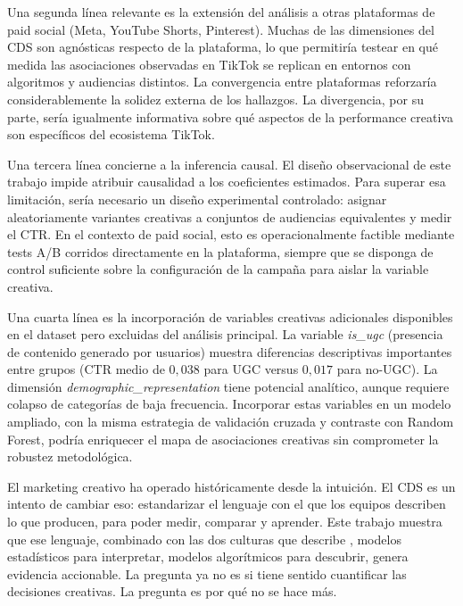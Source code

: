 \documentclass[12pt, a4paper]{report}
\begin{document}
Una segunda línea relevante es la extensión del análisis a otras plataformas de paid
social (Meta, YouTube Shorts, Pinterest). Muchas de las dimensiones del CDS son
agnósticas respecto de la plataforma, lo que permitiría testear en qué medida las
asociaciones observadas en TikTok se replican en entornos con algoritmos y audiencias
distintos. La convergencia entre plataformas reforzaría considerablemente la solidez
externa de los hallazgos. La divergencia, por su parte, sería igualmente informativa sobre
qué aspectos de la performance creativa son específicos del ecosistema TikTok.

Una tercera línea concierne a la inferencia causal. El diseño observacional de este trabajo
impide atribuir causalidad a los coeficientes estimados. Para superar esa limitación, sería
necesario un diseño experimental controlado: asignar aleatoriamente variantes creativas a
conjuntos de audiencias equivalentes y medir el CTR. En el contexto de paid
social, esto es operacionalmente factible mediante tests A/B corridos directamente en la
plataforma, siempre que se disponga de control suficiente sobre la configuración de la
campaña para aislar la variable creativa.

Una cuarta línea es la incorporación de variables creativas adicionales disponibles en el
dataset pero excluidas del análisis principal. La variable \textit{is\_ugc} (presencia de
contenido generado por usuarios) muestra diferencias descriptivas importantes entre
grupos (CTR medio de $0{,}038$ para UGC versus $0{,}017$ para no-UGC). La dimensión
\textit{demographic\_representation} tiene potencial analítico, aunque requiere colapso de
categorías de baja frecuencia. Incorporar estas variables en un modelo ampliado, con la
misma estrategia de validación cruzada y contraste con Random Forest, podría enriquecer
el mapa de asociaciones creativas sin comprometer la robustez metodológica.

El marketing creativo ha operado históricamente desde la intuición. El CDS es un intento
de cambiar eso: estandarizar el lenguaje con el que los equipos describen lo que producen,
para poder medir, comparar y aprender. Este trabajo muestra que ese lenguaje, combinado
con las dos culturas que describe \citet{breiman2001}, modelos estadísticos para
interpretar, modelos algorítmicos para descubrir, genera evidencia accionable. La
pregunta ya no es si tiene sentido cuantificar las decisiones creativas. La pregunta es
por qué no se hace más.



\end{document}

